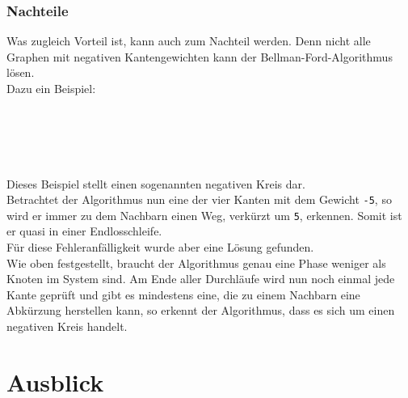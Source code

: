 \documentclass[12pt]{article}
\def\code#1{\texttt{#1}}
\begin{document}
		\subsubsection{Nachteile}
			Was zugleich Vorteil ist, kann auch zum Nachteil werden. Denn nicht alle Graphen mit negativen Kantengewichten kann der Bellman-Ford-Algorithmus lösen.\\
			Dazu ein Beispiel:\\\\\\
			\\\\\\
			Dieses Beispiel stellt einen sogenannten negativen Kreis dar.\\
			Betrachtet der Algorithmus nun eine der vier Kanten mit dem Gewicht \code{-5}, so wird er immer zu dem Nachbarn einen Weg, verkürzt um \code{5}, erkennen. Somit ist er quasi in einer Endlosschleife.\\
			Für diese Fehleranfälligkeit wurde aber eine Lösung gefunden.\\
			Wie oben festgestellt, braucht der Algorithmus genau eine Phase weniger als Knoten im System sind. Am Ende aller Durchläufe wird nun noch einmal jede Kante geprüft und gibt es mindestens eine, die zu einem Nachbarn eine Abkürzung herstellen kann, so erkennt der Algorithmus, dass es sich um einen negativen Kreis handelt. \cite{bellmanford}
		
	

\newpage
\section{Ausblick}
\end{document}
